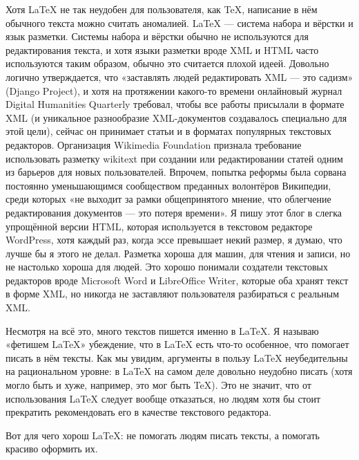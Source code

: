 \par
\fontsize{14pt}{16.8pt}\selectfont
Хотя LaTeX не так неудобен для пользователя, как TeX, написание в нём обычного текста можно считать аномалией. LaTeX — система набора и вёрстки и язык разметки. Системы набора и вёрстки обычно не используются для редактирования текста, и хотя языки разметки вроде XML и HTML часто используются таким образом, обычно это считается плохой идеей. Довольно логично утверждается, что «заставлять людей редактировать XML — это садизм» (Django Project), и хотя на протяжении какого-то времени онлайновый журнал Digital Humanities Quarterly требовал, чтобы все работы присылали в формате XML (и уникальное разнообразие XML-документов создавалось специально для этой цели), сейчас он принимает статьи и в форматах популярных текстовых редакторов. Организация Wikimedia Foundation признала требование использовать разметку wikitext при создании или редактировании статей одним из барьеров для новых пользователей. Впрочем, попытка реформы была сорвана постоянно уменьшающимся сообществом преданных волонтёров Википедии, среди которых «не выходит за рамки общепринятого мнение, что облегчение редактирования документов — это потеря времени». Я пишу этот блог в слегка упрощённой версии HTML, которая используется в текстовом редакторе WordPress, хотя каждый раз, когда эссе превышает некий размер, я думаю, что лучше бы я этого не делал. Разметка хороша для машин, для чтения и записи, но не настолько хороша для людей. Это хорошо понимали создатели текстовых редакторов вроде Microsoft Word и LibreOffice Writer, которые оба хранят текст в форме XML, но никогда не заставляют пользователя разбираться с реальным XML.
\par
\fontsize{14pt}{16.8pt}\selectfont
Несмотря на всё это, много текстов пишется именно в LaTeX. Я называю «фетишем LaTeX» убеждение, что в LaTeX есть что-то особенное, что помогает писать в нём тексты. Как мы увидим, аргументы в пользу LaTeX неубедительны на рациональном уровне: в LaTeX на самом деле довольно неудобно писать (хотя могло быть и хуже, например, это мог быть TeX). Это не значит, что от использования LaTeX следует вообще отказаться, но людям хотя бы стоит прекратить рекомендовать его в качестве текстового редактора.
\par
\fontsize{14pt}{16.8pt}\selectfont
Вот для чего хорош LaTeX: не помогать людям писать тексты, а помогать красиво оформить их.

